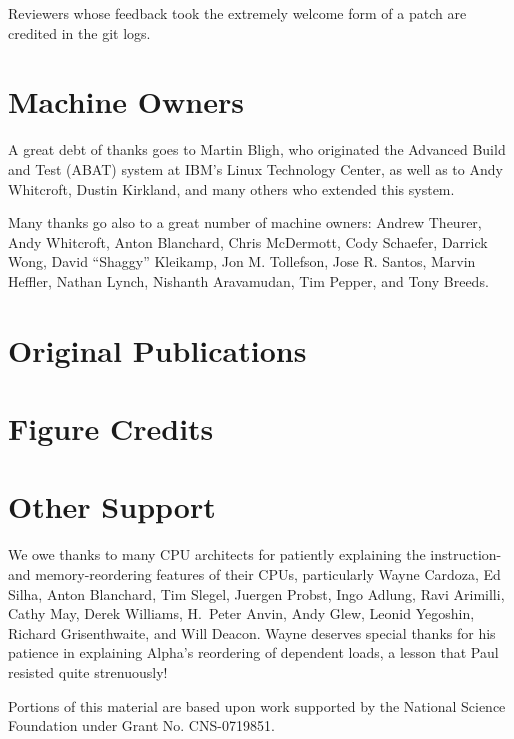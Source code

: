 Reviewers whose feedback took the extremely welcome form of a patch
are credited in the git logs.

\section{Machine Owners}

A great debt of thanks goes to Martin Bligh, who originated the
Advanced Build and Test (ABAT) system at IBM's Linux Technology
Center, as well as to Andy Whitcroft, Dustin Kirkland, and many
others who extended this system.

Many thanks go also to a great number of machine owners:
Andrew Theurer,
Andy Whitcroft,
Anton Blanchard,
Chris McDermott,
Cody Schaefer,
Darrick Wong,
David ``Shaggy'' Kleikamp,
Jon M. Tollefson,
Jose R. Santos,
Marvin Heffler,
Nathan Lynch,
Nishanth Aravamudan,
Tim Pepper,
and
Tony Breeds.

\section{Original Publications}

\ListOriginalPublications

\section{Figure Credits}

\ListContributions

\section{Other Support}

We owe thanks to many CPU architects for patiently explaining the
instruction- and memory-reordering features of their CPUs, particularly
Wayne Cardoza, Ed Silha, Anton Blanchard, Tim Slegel, Juergen Probst,
Ingo Adlung, Ravi Arimilli, Cathy May, Derek Williams,
H.~Peter Anvin,
Andy Glew, Leonid Yegoshin,
Richard Grisenthwaite, and Will Deacon.
Wayne deserves special thanks for his patience in explaining Alpha's reordering
of dependent loads, a lesson that Paul resisted quite strenuously!

Portions of this material are based upon work supported by the National
Science Foundation under Grant No. CNS-0719851.
